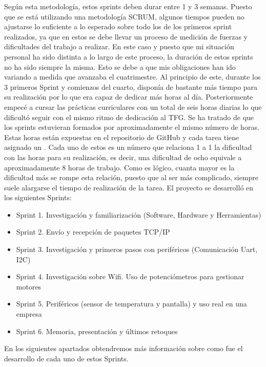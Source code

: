 Según esta metodología, estos sprints deben durar entre 1 y 3 semanas. Puesto que se está utilizando una metodología SCRUM, algunos tiempos pueden no ajustarse lo suficiente a lo esperado sobre todo los de los primeros sprint realizados, ya que en estos se debe llevar un proceso de medición de fuerzas y dificultades del trabajo a realizar. En este caso y puesto que mi situación personal ha sido distinta a lo largo de este proceso, la duración de estos sprints no ha sido siempre la misma. Esto se debe a que mis obligaciones han ido variando a medida que avanzaba el cuatrimestre. Al principio de este, durante los 3 primeros Sprint y comienzos del cuarto, disponía de bastante más tiempo para su realización por lo que era capaz de dedicar más horas al día. Posteriormente empecé a cursar las prácticas curriculares con un total de seis horas diarias lo que dificultó seguir con el mismo ritmo de dedicación al TFG. Se ha tratado de que los sprints estuvieran formados por aproximadamente el mismo número de horas. Estas horas están expuestas en el repositorio de GitHub y cada tarea tiene asignado un . Cada uno de estos  es un número que relaciona 1 a 1 la dificultad con las horas para su realización, es decir, una dificultad de ocho equivale a aproximadamente 8 horas de trabajo. Como es lógico, cuanta mayor es la dificultad más se rompe esta relación, puesto que al ser más complicado, siempre suele alargarse el tiempo de realización de la tarea. 
El proyecto se desarrolló en los siguientes Sprints:
\begin{itemize}
\item Sprint 1. Investigación y familiarización (Software, Hardware y Herramientas)
\item Sprint 2. Envío y recepción de paquetes TCP/IP
\item Sprint 3. Investigación y primeros pasos con periféricos (Comunicación Uart, I2C)
\item Sprint 4. Investigación sobre Wifi. Uso de potenciómetros para gestionar motores
\item Sprint 5. Periféricos (sensor de temperatura y pantalla) y uso real en una empresa
\item Sprint 6. Memoria, presentación y últimos retoques
\end{itemize}
En los siguientes apartados obtendremos más información sobre como fue el desarrollo de cada uno de estos Sprints.


